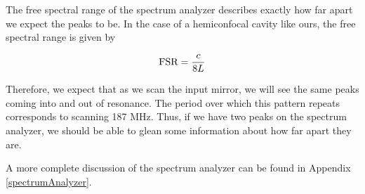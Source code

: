 The free spectral range of the spectrum analyzer describes exactly how far apart we expect the peaks to be. In the case of a hemiconfocal cavity like ours, the free spectral range is given by 

\begin{equation}
    \textnormal{FSR}=\frac{c}{8L}
\end{equation}

Therefore, we expect that as we scan the input mirror, we will see the same peaks coming into and out of resonance. The period over which this pattern repeats corresponds to scanning 187 MHz. Thus, if we have two peaks on the spectrum analyzer, we should be able to glean some information about how far apart they are.

A more complete discussion of the spectrum analyzer can be found in Appendix \ref{spectrumAnalyzer}.
